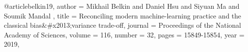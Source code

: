 







@article{belkin19,
author = {Mikhail Belkin  and Daniel Hsu  and Siyuan Ma  and Soumik Mandal },
title = {Reconciling modern machine-learning practice and the classical bias\&\#x2013;variance trade-off},
journal = {Proceedings of the National Academy of Sciences},
volume = {116},
number = {32},
pages = {15849-15854},
year = {2019},
}

